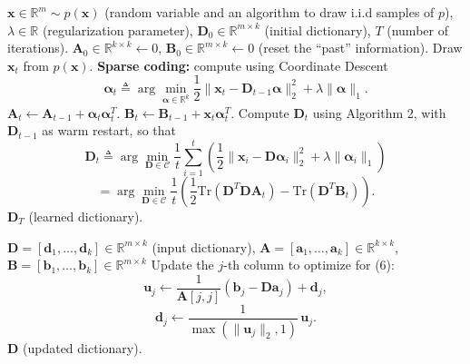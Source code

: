 \documentclass{article}
\theoremstyle{definition}
\begin{document}
\begin{algorithm}[H]
\caption{Online dictionary learning.}
\begin{algorithmic}[1]
\Require $\mathbf{x} \in \mathbb{R}^m \sim p(\mathbf{x})$ (random variable and an algorithm to draw i.i.d samples of $p$),
$\lambda \in \mathbb{R}$ (regularization parameter),
$\mathbf{D}_0 \in \mathbb{R}^{m \times k}$ (initial dictionary),
$T$ (number of iterations).
\State $\mathbf{A}_0 \in \mathbb{R}^{k \times k} \gets 0$, $\mathbf{B}_0 \in \mathbb{R}^{m \times k} \gets 0$ (reset the ``past'' information).
    \State Draw $\mathbf{x}_t$ from $p(\mathbf{x})$.
    \State \textbf{Sparse coding:} compute using Coordinate Descent
    \[
        \boldsymbol{\alpha}_t \triangleq \arg\min_{\boldsymbol{\alpha} \in \mathbb{R}^k}
        \frac{1}{2}\|\mathbf{x}_t - \mathbf{D}_{t-1}\boldsymbol{\alpha}\|_2^2 + \lambda \|\boldsymbol{\alpha}\|_1.
    \]
    \State $\mathbf{A}_t \gets \mathbf{A}_{t-1} + \boldsymbol{\alpha}_t \boldsymbol{\alpha}_t^{T}.$
    \State $\mathbf{B}_t \gets \mathbf{B}_{t-1} + \mathbf{x}_t \boldsymbol{\alpha}_t^{T}.$
    \State Compute $\mathbf{D}_t$ using Algorithm 2, with $\mathbf{D}_{t-1}$ as warm restart, so that
    \[
        \mathbf{D}_t \triangleq \arg\min_{\mathbf{D} \in \mathcal{C}}
        \frac{1}{t} \sum_{i=1}^t \left( 
            \frac{1}{2} \|\mathbf{x}_i - \mathbf{D}\boldsymbol{\alpha}_i\|_2^2 
            + \lambda\|\boldsymbol{\alpha}_i\|_1
        \right)
    \]
    \[
        = \arg\min_{\mathbf{D} \in \mathcal{C}} 
        \frac{1}{t}\left(
            \frac{1}{2}\mathrm{Tr}(\mathbf{D}^T \mathbf{D} \mathbf{A}_t)
            - \mathrm{Tr}(\mathbf{D}^T \mathbf{B}_t)
        \right).
        \tag{6}
    \]
\EndFor
\State \Return $\mathbf{D}_T$ (learned dictionary).
\end{algorithmic}
\end{algorithm}


\begin{algorithm}[H]
\caption{Dictionary Update.}
\begin{algorithmic}[1]
\Require $\mathbf{D} = [\mathbf{d}_1, \ldots, \mathbf{d}_k] \in \mathbb{R}^{m \times k}$ (input dictionary),
$\mathbf{A} = [\mathbf{a}_1, \ldots, \mathbf{a}_k] \in \mathbb{R}^{k \times k}$,
$\mathbf{B} = [\mathbf{b}_1, \ldots, \mathbf{b}_k] \in \mathbb{R}^{m \times k}$
\Repeat
        \State Update the $j$-th column to optimize for (6):
        \[
            \mathbf{u}_j \gets \frac{1}{\mathbf{A}[j,j]} 
            \left( \mathbf{b}_j - \mathbf{D}\mathbf{a}_j \right) + \mathbf{d}_j,
        \]
        \[
            \mathbf{d}_j \gets 
            \frac{1}{\max(\|\mathbf{u}_j\|_2,1)} \, \mathbf{u}_j.
            \tag{7}
        \]
    \EndFor
{}
\State \Return $\mathbf{D}$ (updated dictionary).
\end{algorithmic}
\end{algorithm}
\end{document}
